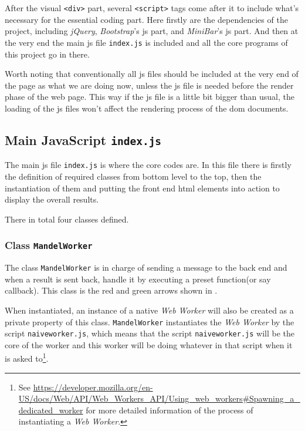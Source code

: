 After the visual \texttt{<div>} part, several \texttt{<script>} tags come after it to include what's necessary for the essential coding part. Here firstly are the dependencies of the project, including \emph{jQuery}, \emph{Bootstrap}'s \gls{js} part, and \emph{MiniBar}'s \gls{js} part. And then at the very end the main \gls{js} file \texttt{index.js} is included and all the core programs of this project go in there.

Worth noting that conventionally all \gls{js} files should be included at the very end of the page as what we are doing now, unless the \gls{js} file is needed before the render phase of the web page. This way if the \gls{js} file is a little bit bigger than usual, the loading of the \gls{js} files won't affect the rendering process of the \gls{dom} documents.


\subsection{Main JavaScript \texttt{index.js}}

The main \gls{js} file \texttt{index.js} is where the core codes are. In this file there is firstly the definition of required classes from bottom level to the top, then the instantiation of them and putting the front end \gls{html} elements into action to display the overall results.

There in total four classes defined.

\subsubsection{Class \texttt{MandelWorker}}

The class \texttt{MandelWorker} is in charge of sending a message to the back end and when a result is sent back, handle it by executing a preset function(or say callback). This class is the red and green arrows shown in .

When instantiated, an instance of a native \emph{Web Worker} will also be created as a private property of this class. \texttt{MandelWorker} instantiates the \emph{Web Worker} by the script \texttt{naive\-worker.js}, which means that the script \texttt{naive\-worker.js} will be the core of the worker and this worker will be doing whatever in that script when it is asked to\footnote{ See \url{https://developer.mozilla.org/en-US/docs/Web/API/Web_Workers_API/Using_web_workers\#Spawning_a_dedicated_worker} for more detailed information of the process of instantiating a \emph{Web Worker}.}.

